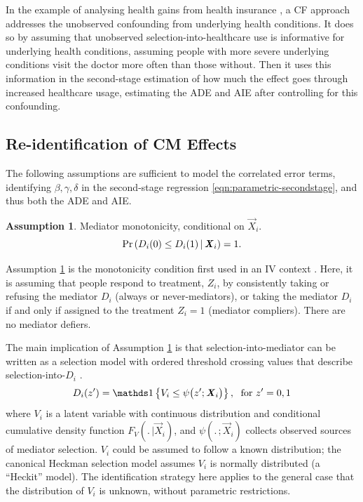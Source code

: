 In the example of analysing health gains from health insurance \citep{finkelstein2008oregon}, a CF approach addresses the unobserved confounding from underlying health conditions.
It does so by assuming that unobserved selection-into-healthcare use is informative for underlying health conditions, assuming people with more severe underlying conditions visit the doctor more often than those without.
Then it uses this information in the second-stage estimation of how much the effect goes through increased healthcare usage, estimating the ADE and AIE after controlling for this confounding.

\subsection{Re-identification of CM Effects}
The following assumptions are sufficient to model the correlated error terms, identifying $\beta, \gamma, \delta$ in the second-stage regression \eqref{eqn:parametric-secondstage}, and thus both the ADE and AIE.

\theoremstyle{definition}
\newtheorem{assumptionCF}{Assumption}
\renewcommand\theassumptionCF{CF--\arabic{assumptionCF}}
\begin{assumptionCF}
    \label{cf:monotonicity}
    Mediator monotonicity, conditional on $\vec X_i$.
    \[ \Pr\left(  D_i(0) \leq D_i(1)  \, \middle\vert \, \boldsymbol{\mathit{X}}_i \right) = 1. \]
\end{assumptionCF}
\noindent
Assumption \ref{cf:monotonicity} is the monotonicity condition first used in an IV context \citep{imbens1994identification}.
Here, it is assuming that people respond to treatment, $Z_i$, by consistently taking or refusing the mediator $D_i$ (always or never-mediators), or taking the mediator $D_i$ if and only if assigned to the treatment $Z_i=1$ (mediator compliers).
There are no mediator defiers.

The main implication of Assumption \ref{cf:monotonicity} is that selection-into-mediator can be written as a selection model with ordered threshold crossing values that describe selection-into-$D_i$ \citep{vytlacil2002independence}.
\[ D_i(z') = \indicator{V_i \leq \psi \big( z'; \vec X_i \big)},
    \;\text{ for } z'=0,1 \]
where $V_i$ is a latent variable with continuous distribution and conditional cumulative density function $F_V(. \,|\vec X_i)$, and $\psi(. \,;\vec X_i)$ collects observed sources of mediator selection.
$V_i$ could be assumed to follow a known distribution; the canonical Heckman selection model assumes $V_i$ is normally distributed (a ``Heckit'' model).
The identification strategy here applies to the general case that the distribution of $V_i$ is unknown, without parametric restrictions.

